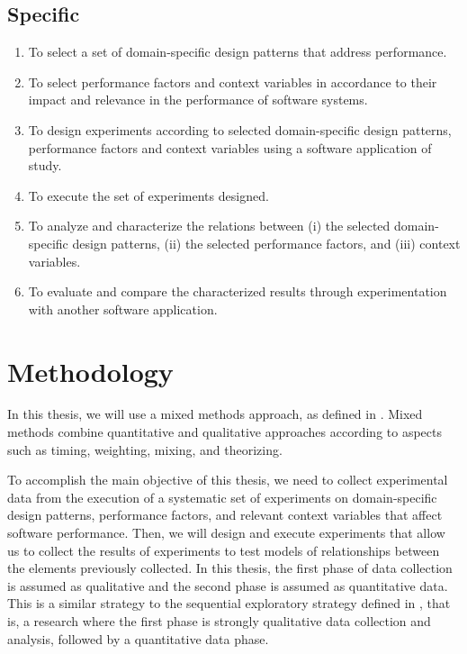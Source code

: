 
\subsection{Specific}
\renewcommand{\theenumi}{\thesubsection.\arabic{enumi}}
\begin{enumerate}
	\item To select a set of domain-specific design patterns that address performance.
	\item To select performance factors and context variables in accordance to their impact and relevance in the performance of software systems.
	\item To design experiments according to selected domain-specific design patterns, performance factors and context variables using a software application of study.
	\item To execute the set of experiments designed.
	\item To analyze and characterize the relations between (i) the selected domain-specific design patterns, (ii) the selected performance factors, and (iii) context variables.
	\item To evaluate and compare the characterized results through experimentation with another software application.
\end{enumerate}
\renewcommand{\theenumi}{\thesubsection.\arabic{enumi}}


\section{Methodology}
In this thesis, we will use a mixed methods approach, as defined in \cite{creswell2009research}. Mixed methods combine quantitative and qualitative approaches according to aspects such as timing, weighting, mixing, and theorizing.

To accomplish the main objective of this thesis, we need to collect experimental data from the execution of a systematic set of experiments on domain-specific design patterns, performance factors, and relevant context variables that affect software performance. Then, we will design and execute experiments that allow us to collect the results of experiments to test models of relationships between the elements previously collected. In this thesis, the first phase of data collection is assumed as qualitative and the second phase is assumed as quantitative data. This is a similar strategy to the sequential exploratory strategy defined in \cite{creswell2009research}, that is, a research where the first phase is strongly qualitative data collection and analysis, followed by a quantitative data phase.

